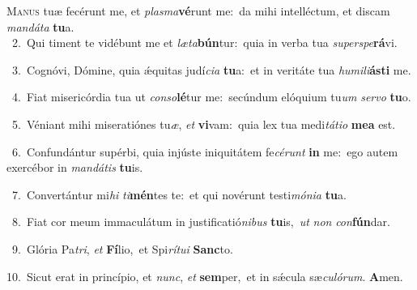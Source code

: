 \lettrine{\initial\textcolor{\initialcolor}{M}}{anus} tuæ fecérunt me, et \textit{plas}\-\textit{ma}\textbf{vé}runt me:~\star da mihi intelléctum, et discam \textit{man}\-\textit{dá}\textit{ta} \textbf{tu}\-a.\\
{\numbfont\textcolor{\numbcolor}{~2.}}~Qui timent te vidébunt me et \textit{læ}\-\textit{ta}\textbf{bún}tur:~\star quia in verba tua \textit{su}\-\textit{per}\textit{spe}\textbf{rá}vi.\par
{\numbfont\textcolor{\numbcolor}{~3.}}~Cognóvi, Dómine, quia ǽquitas judí\-\textit{ci}\-\textit{a} \textbf{tu}\-a:~\star et in veritáte tua \textit{hu}\-\textit{mi}\textit{li}\textbf{ás}\textbf{ti} me.\par
{\numbfont\textcolor{\numbcolor}{~4.}}~Fiat misericórdia tua ut \textit{con}\-\textit{so}\textbf{lé}tur me:~\star secúndum elóquium tu\textit{um} \textit{ser}\-\textit{vo} \textbf{tu}\-o.\par
{\numbfont\textcolor{\numbcolor}{~5.}}~Véniant mihi miseratiónes tu\-\textit{æ}\-, \textit{et} \textbf{vi}\-vam:~\star quia lex tua medi\-\textit{tá}\-\textit{ti}\textit{o} \textbf{me}\-\textbf{a} est.\par
{\numbfont\textcolor{\numbcolor}{~6.}}~Confundántur supérbi, quia injúste iniquitátem fe\-\textit{cé}\-\textit{runt} \textbf{in} me:~\star ego autem exercébor in \textit{man}\-\textit{dá}\textit{tis} \textbf{tu}\-is.\par
{\numbfont\textcolor{\numbcolor}{~7.}}~Convertántur mi\textit{hi} \textit{ti}\-\textbf{mén}tes te:~\star et qui novérunt testi\-\textit{mó}\-\textit{ni}\textit{a} \textbf{tu}\-a.\par
{\numbfont\textcolor{\numbcolor}{~8.}}~Fiat cor meum immaculátum in justificatió\-\textit{ni}\-\textit{bus} \textbf{tu}\-is,~\star \textit{ut} \textit{non} \textit{con}\-\textbf{fún}dar.\par
{\numbfont\textcolor{\numbcolor}{~9.}}~Glória Pa\-\textit{tri}\-, \textit{et} \textbf{Fí}\-lio,~\star et Spi\-\textit{rí}\-\textit{tu}\textit{i} \textbf{Sanc}\-to.\par
{\numbfont\textcolor{\numbcolor}{10.}}~Sicut erat in princípio, et \textit{nunc}\-, \textit{et} \textbf{sem}\-per,~\star et in sǽcula sæ\-\textit{cu}\-\textit{ló}\textit{rum}. \textbf{A}\-men.\par
